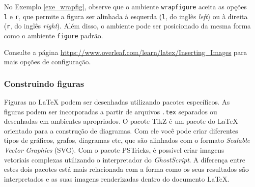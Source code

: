 No Exemplo \ref{exe_wrapfig}, observe que o ambiente {\tt wrapfigure} aceita as opções {\tt l} e {\tt r}, que permite a figura ser alinhada à esquerda ({\tt l}, do inglês \textit{left}) ou à direita ({\tt r}, do inglês \textit{right}). Além disso, o ambiente pode ser posicionado da mesma forma como o ambiente {\tt figure} padrão.

\begin{marker}
  Consulte a página \url{https://www.overleaf.com/learn/latex/Inserting_Images} para mais opções de configuração.
\end{marker}

\subsubsection*{Construindo figuras}
\label{sec:const_figs}


Figuras no \LaTeX{} podem ser desenhadas utilizando pacotes específicos. As figuras podem ser incorporadas a partir de arquivos {\tt .tex} separados ou desenhadas em ambientes apropriados. O pacote TikZ é um pacote do \LaTeX{} orientado para a construção de diagramas. Com ele você pode criar diferentes tipos de gráficos, grafos, diagramas etc, que são alinhados com o formato \textit{Scalable Vector Graphics} (SVG). Com o pacote PSTricks, é possível criar imagens vetoriais complexas utilizando o interpretador do \textit{GhostScript}. A diferença entre estes dois pacotes está mais relacionada com a forma como os seus resultados são interpretados e as suas imagens renderizadas dentro do documento \LaTeX{}. %

